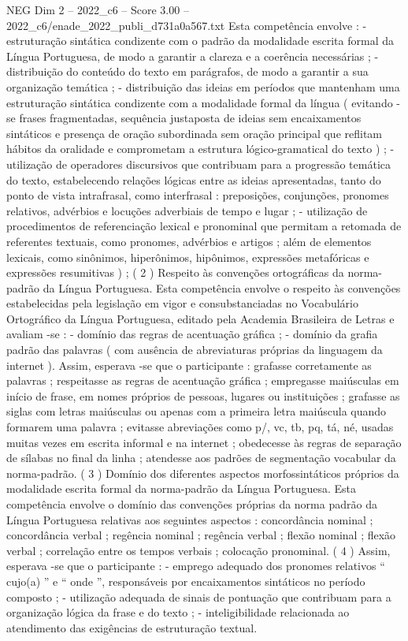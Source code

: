 \begin{textsample}{NEG Dim 2 – 2022\_c6 – Score 3.00 – 2022\_c6/enade\_2022\_publi\_d731a0a567.txt}
Esta competência envolve : - estruturação sintática condizente com o padrão da modalidade escrita formal da Língua Portuguesa, de modo a garantir a clareza e a coerência necessárias ; - distribuição do conteúdo do texto em parágrafos, de modo a garantir a sua organização temática ; - distribuição das ideias em períodos que mantenham uma estruturação sintática condizente com a modalidade formal da língua ( evitando -se frases fragmentadas, sequência justaposta de ideias sem encaixamentos sintáticos e presença de oração subordinada sem oração principal que reflitam hábitos da oralidade e comprometam a estrutura lógico-gramatical do texto ) ; - utilização de operadores discursivos que contribuam para a progressão temática do texto, estabelecendo relações lógicas entre as ideias apresentadas, tanto do ponto de vista intrafrasal, como interfrasal : preposições, conjunções, pronomes relativos, advérbios e locuções adverbiais de tempo e lugar ; - utilização de procedimentos de referenciação lexical e pronominal que permitam a retomada de referentes textuais, como pronomes, advérbios e artigos ; além de elementos lexicais, como sinônimos, hiperônimos, hipônimos, expressões metafóricas e expressões resumitivas ) ; ( 2 ) Respeito às convenções ortográficas da norma-padrão da Língua Portuguesa.
Esta competência envolve o respeito às convenções estabelecidas pela legislação em vigor e consubstanciadas no Vocabulário Ortográfico da Língua Portuguesa, editado pela Academia Brasileira de Letras e avaliam -se : - domínio das regras de acentuação gráfica ; - domínio da grafia padrão das palavras ( com ausência de abreviaturas próprias da linguagem da internet ).
Assim, esperava -se que o participante : grafasse corretamente as palavras ; respeitasse as regras de acentuação gráfica ; empregasse maiúsculas em início de frase, em nomes próprios de pessoas, lugares ou instituições ; grafasse as siglas com letras maiúsculas ou apenas com a primeira letra maiúscula quando formarem uma palavra ; evitasse abreviações como p/, vc, tb, pq, tá, né, usadas muitas vezes em escrita informal e na internet ; obedecesse às regras de separação de sílabas no final da linha ; atendesse aos padrões de segmentação vocabular da norma-padrão. ( 3 ) Domínio dos diferentes aspectos morfossintáticos próprios da modalidade escrita formal da norma-padrão da Língua Portuguesa.
Esta competência envolve o domínio das convenções próprias da norma padrão da Língua Portuguesa relativas aos seguintes aspectos : concordância nominal ; concordância verbal ; regência nominal ; regência verbal ; flexão nominal ; flexão verbal ; correlação entre os tempos verbais ; colocação pronominal. ( 4 ) Assim, esperava -se que o participante : - emprego adequado dos pronomes relativos “ cujo(a) ” e “ onde ”, responsáveis por encaixamentos sintáticos no período composto ; - utilização adequada de sinais de pontuação que contribuam para a organização lógica da frase e do texto ; - inteligibilidade relacionada ao atendimento das exigências de estruturação textual.

\end{textsample}
